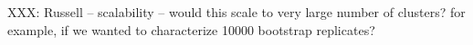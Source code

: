 \documentclass[12pt]{cmuthesis}
\begin{document}
  XXX: Russell -- scalability -- would this scale to very large number of clusters? for example, if we wanted to characterize 10000 bootstrap replicates?







\end{document}
